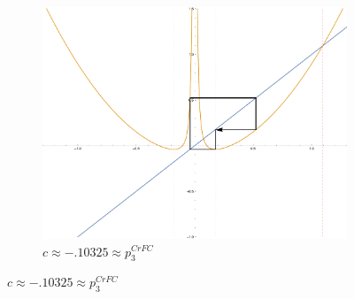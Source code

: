 \begin{figure}[ht]
\begin{subfigure}[b]{0.3\textwidth}
				\includegraphics[width=\textwidth]{./img/plot-010325}
				\caption{$c \approx - .10325 \approx p_3^{CrFC}$}
		\end{subfigure}


\end{figure}
